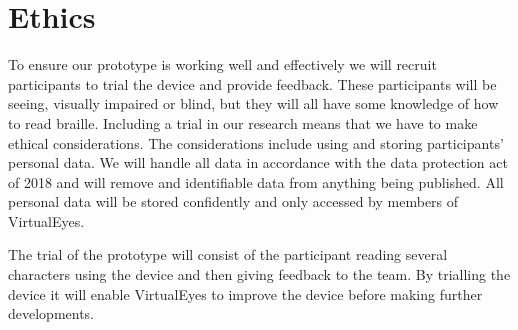 \section{Ethics}
To ensure our prototype is working well and effectively we will recruit participants to trial the device and provide feedback. These participants will be seeing, visually impaired or blind, but they will all have some knowledge of how to read braille. Including a trial in our research means that we have to make ethical considerations. The considerations include using and storing participants’ personal data. We will handle all data in accordance with the data protection act of 2018 and will remove and identifiable data from anything being published. All personal data will be stored confidently and only accessed by members of VirtualEyes. 

The trial of the prototype will consist of the participant reading several characters using the device and then giving feedback to the team. By trialling the device it will enable VirtualEyes to improve the device before making further developments. 
